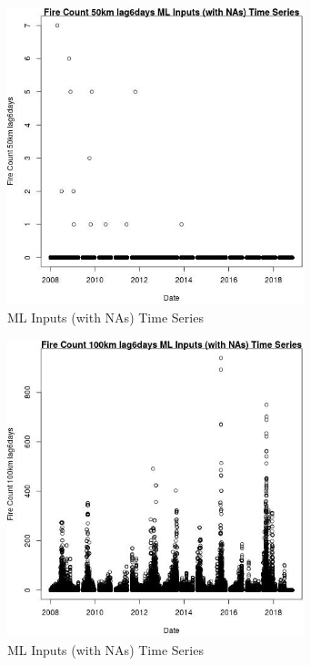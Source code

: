 \begin{figure} 
\centering  
\includegraphics[width=0.77\textwidth]{Code_Outputs/Report_ML_input_PM25_Step4_part_e_de_duplicated_aves_compiled_2019-05-20wNAs_Fire_Count_50km_lag6daysvDate.jpg} 
\caption{\label{fig:Report_ML_input_PM25_Step4_part_e_de_duplicated_aves_compiled_2019-05-20wNAsFire_Count_50km_lag6daysvDate}ML Inputs (with NAs) Time Series} 
\end{figure} 
 

\begin{figure} 
\centering  
\includegraphics[width=0.77\textwidth]{Code_Outputs/Report_ML_input_PM25_Step4_part_e_de_duplicated_aves_compiled_2019-05-20wNAs_Fire_Count_100km_lag6daysvDate.jpg} 
\caption{\label{fig:Report_ML_input_PM25_Step4_part_e_de_duplicated_aves_compiled_2019-05-20wNAsFire_Count_100km_lag6daysvDate}ML Inputs (with NAs) Time Series} 
\end{figure} 
 


